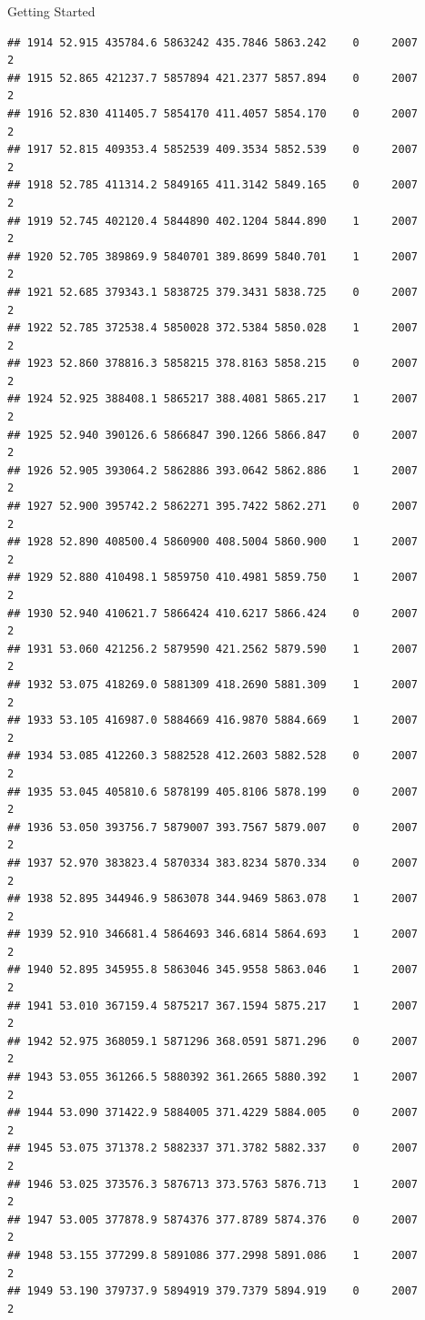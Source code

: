 \documentclass[
  ignorenonframetext,
]{beamer}
\begin{document}
\begin{frame}[fragile]{Getting Started}
\begin{verbatim}
## 1914 52.915 435784.6 5863242 435.7846 5863.242    0     2007        2
## 1915 52.865 421237.7 5857894 421.2377 5857.894    0     2007        2
## 1916 52.830 411405.7 5854170 411.4057 5854.170    0     2007        2
## 1917 52.815 409353.4 5852539 409.3534 5852.539    0     2007        2
## 1918 52.785 411314.2 5849165 411.3142 5849.165    0     2007        2
## 1919 52.745 402120.4 5844890 402.1204 5844.890    1     2007        2
## 1920 52.705 389869.9 5840701 389.8699 5840.701    1     2007        2
## 1921 52.685 379343.1 5838725 379.3431 5838.725    0     2007        2
## 1922 52.785 372538.4 5850028 372.5384 5850.028    1     2007        2
## 1923 52.860 378816.3 5858215 378.8163 5858.215    0     2007        2
## 1924 52.925 388408.1 5865217 388.4081 5865.217    1     2007        2
## 1925 52.940 390126.6 5866847 390.1266 5866.847    0     2007        2
## 1926 52.905 393064.2 5862886 393.0642 5862.886    1     2007        2
## 1927 52.900 395742.2 5862271 395.7422 5862.271    0     2007        2
## 1928 52.890 408500.4 5860900 408.5004 5860.900    1     2007        2
## 1929 52.880 410498.1 5859750 410.4981 5859.750    1     2007        2
## 1930 52.940 410621.7 5866424 410.6217 5866.424    0     2007        2
## 1931 53.060 421256.2 5879590 421.2562 5879.590    1     2007        2
## 1932 53.075 418269.0 5881309 418.2690 5881.309    1     2007        2
## 1933 53.105 416987.0 5884669 416.9870 5884.669    1     2007        2
## 1934 53.085 412260.3 5882528 412.2603 5882.528    0     2007        2
## 1935 53.045 405810.6 5878199 405.8106 5878.199    0     2007        2
## 1936 53.050 393756.7 5879007 393.7567 5879.007    0     2007        2
## 1937 52.970 383823.4 5870334 383.8234 5870.334    0     2007        2
## 1938 52.895 344946.9 5863078 344.9469 5863.078    1     2007        2
## 1939 52.910 346681.4 5864693 346.6814 5864.693    1     2007        2
## 1940 52.895 345955.8 5863046 345.9558 5863.046    1     2007        2
## 1941 53.010 367159.4 5875217 367.1594 5875.217    1     2007        2
## 1942 52.975 368059.1 5871296 368.0591 5871.296    0     2007        2
## 1943 53.055 361266.5 5880392 361.2665 5880.392    1     2007        2
## 1944 53.090 371422.9 5884005 371.4229 5884.005    0     2007        2
## 1945 53.075 371378.2 5882337 371.3782 5882.337    0     2007        2
## 1946 53.025 373576.3 5876713 373.5763 5876.713    1     2007        2
## 1947 53.005 377878.9 5874376 377.8789 5874.376    0     2007        2
## 1948 53.155 377299.8 5891086 377.2998 5891.086    1     2007        2
## 1949 53.190 379737.9 5894919 379.7379 5894.919    0     2007        2

\end{verbatim}
\end{frame}
\end{document}
